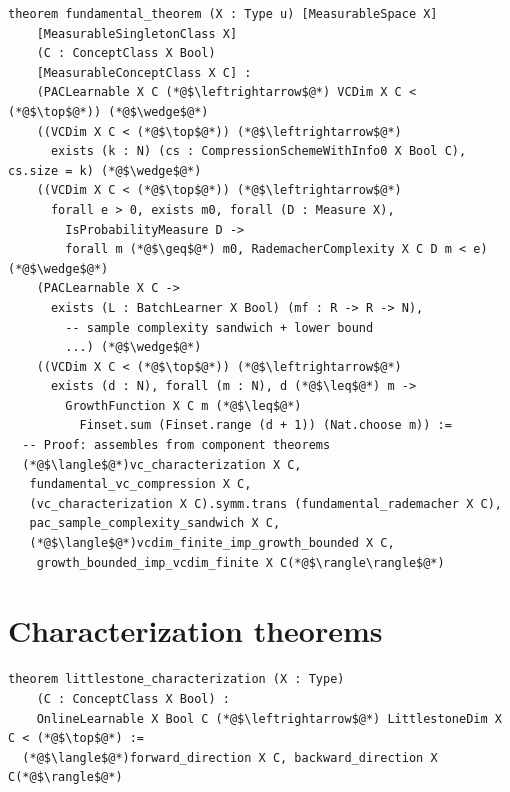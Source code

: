 \begin{lstlisting}[caption={Fundamental theorem of statistical learning (Theorem/PAC.lean:293)}]
theorem fundamental_theorem (X : Type u) [MeasurableSpace X]
    [MeasurableSingletonClass X]
    (C : ConceptClass X Bool)
    [MeasurableConceptClass X C] :
    (PACLearnable X C (*@$\leftrightarrow$@*) VCDim X C < (*@$\top$@*)) (*@$\wedge$@*)
    ((VCDim X C < (*@$\top$@*)) (*@$\leftrightarrow$@*)
      exists (k : N) (cs : CompressionSchemeWithInfo0 X Bool C), cs.size = k) (*@$\wedge$@*)
    ((VCDim X C < (*@$\top$@*)) (*@$\leftrightarrow$@*)
      forall e > 0, exists m0, forall (D : Measure X),
        IsProbabilityMeasure D ->
        forall m (*@$\geq$@*) m0, RademacherComplexity X C D m < e) (*@$\wedge$@*)
    (PACLearnable X C ->
      exists (L : BatchLearner X Bool) (mf : R -> R -> N),
        -- sample complexity sandwich + lower bound
        ...) (*@$\wedge$@*)
    ((VCDim X C < (*@$\top$@*)) (*@$\leftrightarrow$@*)
      exists (d : N), forall (m : N), d (*@$\leq$@*) m ->
        GrowthFunction X C m (*@$\leq$@*)
          Finset.sum (Finset.range (d + 1)) (Nat.choose m)) :=
  -- Proof: assembles from component theorems
  (*@$\langle$@*)vc_characterization X C,
   fundamental_vc_compression X C,
   (vc_characterization X C).symm.trans (fundamental_rademacher X C),
   pac_sample_complexity_sandwich X C,
   (*@$\langle$@*)vcdim_finite_imp_growth_bounded X C,
    growth_bounded_imp_vcdim_finite X C(*@$\rangle\rangle$@*)
\end{lstlisting}

\section{Characterization theorems}

\begin{lstlisting}[caption={Littlestone characterization (Theorem/Online.lean:419)}]
theorem littlestone_characterization (X : Type)
    (C : ConceptClass X Bool) :
    OnlineLearnable X Bool C (*@$\leftrightarrow$@*) LittlestoneDim X C < (*@$\top$@*) :=
  (*@$\langle$@*)forward_direction X C, backward_direction X C(*@$\rangle$@*)
\end{lstlisting}

